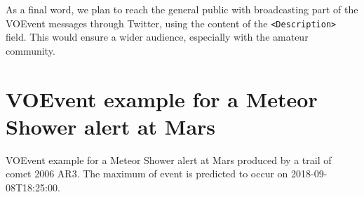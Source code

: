\documentclass[referee,a4paper,12pt,traditabstract]{swsc}
\begin{document}
\begin{linenumbers}
As a final word, we plan to reach the general public with broadcasting part of the VOEvent messages through Twitter, using the content of the {\tt <Description>} field. This would ensure a wider audience, especially with the amateur community.




\appendix

\section{VOEvent example for a Meteor Shower alert at Mars}
\label{appendix-xml-voevent-meteor}

VOEvent example for a Meteor Shower alert at Mars produced by a trail of comet 2006 AR3. The maximum of event is predicted to occur on 2018-09-08T18:25:00.


\end{linenumbers}
\end{document}

